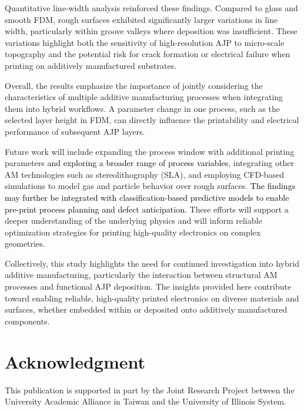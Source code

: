 \documentclass[subscriptcorrection,upint,varvw,balance,hyphenate]{asmejour}
\newcommand{\rev}[1]{\textcolor{black}{#1\xspace}}
\begin{document}
Quantitative line-width analysis reinforced these findings. Compared to glass and smooth FDM, rough surfaces exhibited significantly larger variations in line width, particularly within groove valleys where deposition was insufficient. These variations highlight both the sensitivity of high-resolution AJP to micro-scale topography and the potential risk for crack formation or electrical failure when printing on additively manufactured substrates.

Overall, the results emphasize the importance of jointly considering the characteristics of multiple additive manufacturing processes when integrating them into hybrid workflows. A parameter change in one process, such as the selected layer height in FDM, can directly influence the printability and electrical performance of subsequent AJP layers.

Future work will include expanding the process window with additional printing parameters \rev{and exploring a broader range of process variables}, integrating other AM technologies such as stereolithography (SLA), and employing CFD-based simulations to model gas and particle behavior over rough surfaces. \rev{The findings may further be integrated with classification-based predictive models to enable pre-print process planning and defect anticipation.} These efforts will support a deeper understanding of the underlying physics and will inform reliable optimization strategies for printing high-quality electronics on complex geometries.

Collectively, this study highlights the need for continued investigation into hybrid additive manufacturing, particularly the interaction between structural AM processes and functional AJP deposition. The insights provided here contribute toward enabling reliable, high-quality printed electronics on diverse materials and surfaces, whether embedded within or deposited onto additively manufactured components.

\section*{Acknowledgment}
This publication is supported in part by the Joint Research Project between the University Academic Alliance in Taiwan and the University of Illinois System.


 
\end{document}
